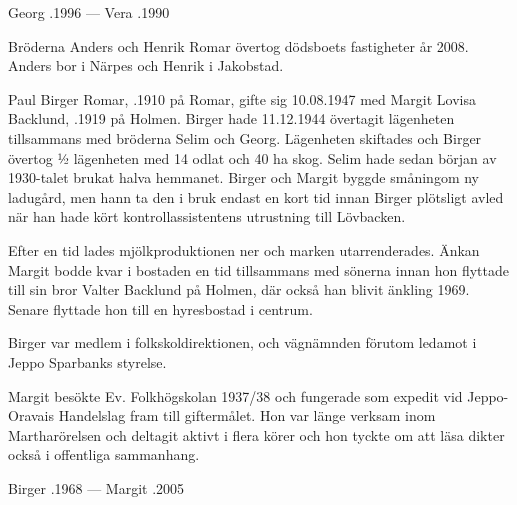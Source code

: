 Georg .1996  ---  Vera .1990



%


%
Bröderna Anders och Henrik Romar övertog dödsboets fastigheter år 2008. Anders bor i Närpes och Henrik i Jakobstad.\jhvspace{}



%
Paul Birger Romar, .1910 på Romar, gifte sig 10.08.1947 med Margit Lovisa Backlund, .1919 på Holmen. Birger hade 11.12.1944 övertagit lägenheten tillsammans med bröderna Selim och Georg. Lägenheten skiftades och Birger övertog ½ lägenheten med 14 odlat och 40 ha skog. Selim hade sedan början av 1930-talet brukat halva hemmanet. Birger och Margit byggde småningom ny ladugård, men hann ta den i bruk endast en kort tid innan Birger plötsligt avled när han hade kört kontrollassistentens utrustning till Lövbacken.

Efter en tid lades mjölkproduktionen ner och marken utarrenderades. Änkan Margit bodde kvar i bostaden en tid tillsammans med sönerna innan hon flyttade till sin bror Valter Backlund på Holmen, där också han blivit änkling 1969. Senare flyttade hon till en hyresbostad i centrum.

Birger var medlem i folkskoldirektionen, och vägnämnden förutom ledamot i Jeppo Sparbanks styrelse.

Margit besökte Ev. Folkhögskolan 1937/38 och fungerade som expedit vid Jeppo-Oravais Handelslag fram till giftermålet. Hon var länge verksam inom Martharörelsen och deltagit aktivt i flera körer och hon tyckte om att läsa dikter också i offentliga sammanhang.

\begin{jhchildren}
  \item {}
  \item {}
\end{jhchildren}

Birger .1968  ---  Margit .2005


